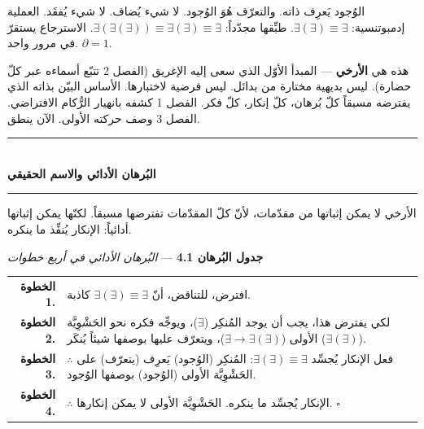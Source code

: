 \documentclass[10pt, openany, oneside]{book}
\renewcommand{\normalsize}{\fontsize{10}{13}\selectfont}
\begin{document}
الوُجود يَعرِف ذاته. والتعرّف هُوَ الوُجود. لا شيء يُضاف. لا شيء يُفقَد. العملية إدمبوتنسية: $\exists(\exists) \equiv \exists$. طبِّقها مجدّداً: $\exists(\exists(\exists)) \equiv \exists(\exists) \equiv \exists$. الاسترجاع يستقرّ في مرور واحد. $\partial = 1$.

هذه هي \textbf{الأرخي} --- المبدأ الأوّل الذي سعى إليه الإغريق (الفصل 2 تتبّع أسماءه عبر كلّ حضارة). ليس بديهية مختارة من بدائل. ليس فرضية لاختبارها. الأساس البيّن بذاته الذي يفترضه مسبقاً كلّ بُرهان، كلّ إنكار، كلّ فكر. الفصل 1 كشفه بانهيار الرُّكام الافتراضي. الفصل 3 وصف حركته الأولى. الآن ينطق.

\vspace{1.5em}


\begin{center}
    \rule{0.3\textwidth}{0.4pt}\\[0.5em]
    {\normalsize\bfseries البُرهان الأدائي والاسم الحقيقي}\\[0.3em]
    \rule{0.3\textwidth}{0.4pt}
\end{center}

\vspace{1em}

\noindent الأرخي لا يمكن إثباتها من مقدّمات، لأنّ كلّ المقدّمات تفترضها مسبقاً. لكنّها يمكن إثباتها أدائياً: الإنكار يُنفِّذ ما ينكره.

\vspace{0.5em}

\textbf{جدول البُرهان 4.1} --- \textit{البُرهان الأدائي في أربع خطوات}

\vspace{0.5em}

\noindent\begin{tabular}{r p{}}
\textbf{الخطوة 1.} & افترض، للتناقض، أنّ $\exists(\exists) \equiv \exists$ كاذبة. \\[0.3em]
\textbf{الخطوة 2.} & لكي يفترض هذا، يجب أن يوجد المُنكِر ($\exists$)، ويوجِّه فكره نحو الحَشْوِيَّة الأولى ($\exists \to \exists(\exists)$)، ويتعرّف عليها بوصفها شيئاً يُنكَر ($\exists(\exists)$). \\[0.3em]
\textbf{الخطوة 3.} & $\therefore$ فعل الإنكار يُجسِّد $\exists(\exists) \equiv \exists$: المُنكِر (الوُجود) يَعرِف (يتعرّف) على الحَشْوِيَّة الأولى (الوُجود) بوصفها الوُجود. \\[0.3em]
\textbf{الخطوة 4.} & $\therefore$ الإنكار يُجسِّد ما ينكره. الحَشْوِيَّة الأولى لا يمكن إنكارها. $\square$ \\[0.3em]
\end{tabular}
\end{document}
